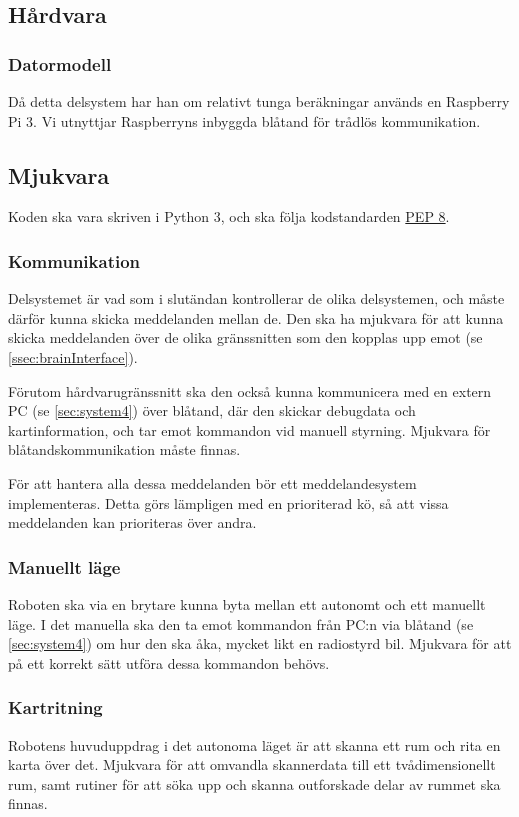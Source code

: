 \documentclass[a4paper,11pt]{article}
\begin{document}
\subsection{Hårdvara}

\subsubsection{Datormodell}
Då detta delsystem har han om relativt tunga beräkningar används en Raspberry Pi 3. Vi utnyttjar Raspberryns inbyggda blåtand för trådlös kommunikation.

\subsection{Mjukvara}

Koden ska vara skriven i Python 3, och ska följa kodstandarden \href{https://www.python.org/dev/peps/pep-0008/}{PEP 8}.

\subsubsection{Kommunikation}
Delsystemet är vad som i slutändan kontrollerar de olika delsystemen, och måste därför kunna skicka meddelanden mellan de. Den ska ha mjukvara för att kunna skicka meddelanden över de olika gränssnitten som den kopplas upp emot (se \ref{ssec:brainInterface}).

Förutom hårdvarugränssnitt ska den också kunna kommunicera med en extern PC (se \ref{sec:system4}) över blåtand, där den skickar debugdata och kartinformation, och tar emot kommandon vid manuell styrning. Mjukvara för blåtandskommunikation måste finnas.

För att hantera alla dessa meddelanden bör ett meddelandesystem implementeras. Detta görs lämpligen med en prioriterad kö, så att vissa meddelanden kan prioriteras över andra.

\subsubsection{Manuellt läge}
Roboten ska via en brytare kunna byta mellan ett autonomt och ett manuellt läge. I det manuella ska den ta emot kommandon från PC:n via blåtand (se \ref{sec:system4}) om hur den ska åka, mycket likt en radiostyrd bil. Mjukvara för att på ett korrekt sätt utföra dessa kommandon behövs.

\subsubsection{Kartritning}
Robotens huvuduppdrag i det autonoma läget är att skanna ett rum och rita en karta över det. Mjukvara för att omvandla skannerdata till ett tvådimensionellt rum, samt rutiner för att söka upp och skanna outforskade delar av rummet ska finnas.
\end{document}
